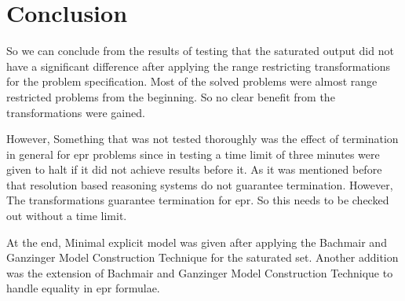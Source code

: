 \chapter{Conclusion}\label{chap:concl}


So we can conclude from the results of testing that the saturated output did not have a significant difference after applying the range restricting transformations for the problem specification. Most of the solved problems were almost range restricted problems from the beginning. So no clear benefit from the transformations were gained.


However, Something that was not tested thoroughly was the effect of termination in general for \ac{epr} problems since in testing a time limit of three minutes were given to halt if it did not achieve results before it. As it was mentioned before that resolution based reasoning systems do not guarantee termination. However, The transformations guarantee termination for \ac{epr}. So this needs to be checked out without a time limit.


At the end, Minimal explicit model was given after applying the Bachmair and Ganzinger Model Construction Technique for the saturated set. Another addition was the extension of Bachmair and Ganzinger Model Construction Technique to handle equality in \ac{epr} formulae.
